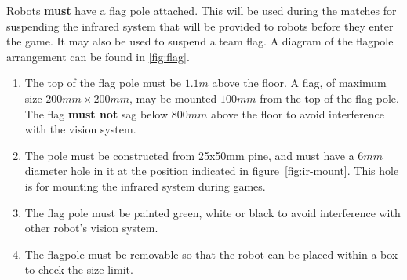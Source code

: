 Robots \textbf{must} have a flag pole attached.  This will be used during the matches for suspending the infrared system that will be provided to robots before they enter the game.  It may also be used to suspend a team flag.  A diagram of the flagpole arrangement can be found in \autoref{fig:flag}.

\begin{enumerate}
\item The top of the flag pole must be $1.1m$ above the floor.  A flag, of maximum size $200mm \times 200mm$, may be mounted $100mm$ from the top of the flag pole.  The flag \textbf{must not} sag below $800mm$ above the floor to avoid interference with the vision system.

\item The pole must be constructed from 25x50mm pine, and must have a $6mm$ diameter hole in it at the position indicated in figure~\ref{fig:ir-mount}.  This hole is for mounting the infrared system during games.

\item The flag pole must be painted green, white or black to avoid interference with other robot's vision system.

\item The flagpole must be removable so that the robot can be placed within a box to check the size limit.
\end{enumerate}

